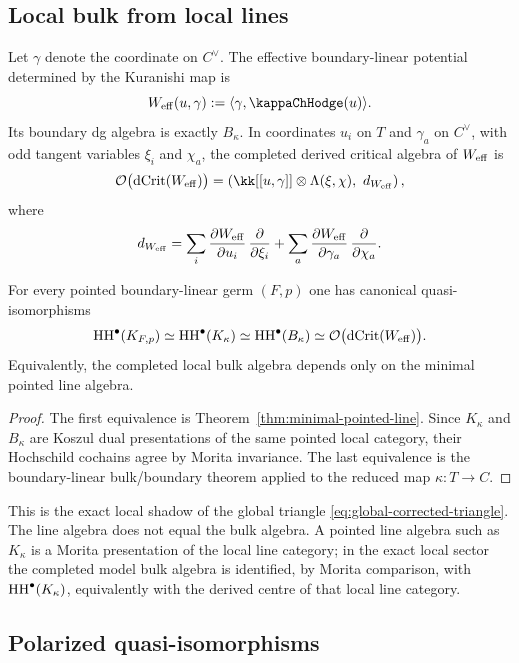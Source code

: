 \subsection{Local bulk from local lines}

Let $\gamma$ denote the coordinate on $C^\vee$. The effective boundary-linear potential determined by the Kuranishi map is
\[
W_{\eff}(u,\gamma):=\langle \gamma,\kappaChHodge(u)\rangle.
\]
Its boundary dg algebra is exactly $B_\kappa$.
In coordinates \(u_i\) on \(T\) and \(\gamma_a\) on \(C^\vee\), with
odd tangent variables \(\xi_i\) and \(\chi_a\), the completed derived
critical algebra of \(W_{\mathrm{eff}}\) is
\[
\cO\bigl(\dCrit(W_{\eff})\bigr)
=
\left(
\kk[[u,\gamma]]\ot\Lambda(\xi,\chi),
\ d_{W_{\eff}}
\right),
\]
where
\[
d_{W_{\mathrm{eff}}}
=
\sum_i
\frac{\partial W_{\mathrm{eff}}}{\partial u_i}\,
\frac{\partial}{\partial \xi_i}
+
\sum_a
\frac{\partial W_{\mathrm{eff}}}{\partial \gamma_a}\,
\frac{\partial}{\partial \chi_a}.
\]

\begin{theorem}%
For every pointed boundary-linear germ $(F,p)$ one has canonical quasi-isomorphisms
\[
\operatorname{HH}^\bullet(K_{F,p})
\simeq
\operatorname{HH}^\bullet(K_\kappa)
\simeq
\operatorname{HH}^\bullet(B_\kappa)
\simeq
\mathcal O\bigl(\operatorname{dCrit}(W_{\mathrm{eff}})\bigr).
\]
Equivalently, the completed local bulk algebra depends only on the minimal pointed line algebra.
\end{theorem}

\begin{proof}
The first equivalence is Theorem~\ref{thm:minimal-pointed-line}. Since $K_\kappa$ and $B_\kappa$ are Koszul dual presentations of the same pointed local category, their Hochschild cochains agree by Morita invariance. The last equivalence is the boundary-linear bulk/boundary theorem applied to the reduced map $\kappa:T\to C$.
\end{proof}

\begin{remark}
This is the exact local shadow of the global triangle
\eqref{eq:global-corrected-triangle}. The line algebra does not equal
the bulk algebra. A pointed line algebra such as \(K_\kappa\) is a
Morita presentation of the local line category; in the exact local
sector the completed model bulk algebra is identified, by Morita
comparison, with \(\operatorname{HH}^\bullet(K_\kappa)\), equivalently with the
derived centre of that local line category.
\end{remark}

\subsection{Polarized quasi-isomorphisms}

